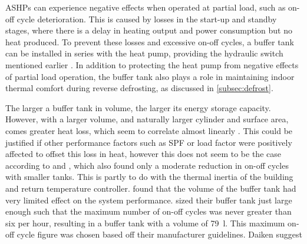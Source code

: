 \acp{ASHP} can experience negative effects when operated at partial load, such as on-off cycle deterioration. This is caused by losses in the start-up and standby stages, where there is a delay in heating output and power consumption but no heat produced. To prevent these losses and excessive on-off cycles, a buffer tank can be installed in series with the heat pump, providing the hydraulic switch mentioned earlier \cite{bagarella_cycling_2013}. In addition to protecting the heat pump from negative effects of partial load operation, the buffer tank also plays a role in maintaining indoor thermal comfort during reverse defrosting, as discussed in \cref{subsec:defrost}.

The larger a buffer tank in volume, the larger its energy storage capacity. However, with a larger volume, and naturally larger cylinder and surface area, comes greater heat loss, which seem to correlate almost linearly \cite{klein_numerical_2014}. This could be justified if other performance factors such as \ac{SPF} or load factor were positively affected to offset this loss in heat, however this does not seem to be the case according to \cite{roccatello_analysis_2022} and \cite{klein_numerical_2014}, which also found only a moderate reduction in on-off cycles with smaller tanks. This is partly to do with the thermal inertia of the building and return temperature controller. 
\citeauthor{klein_numerical_2014} found that the volume of the buffer tank had very limited effect on the system performance. \citeauthor{dongellini_influence_2021} \cite{dongellini_influence_2021} sized their buffer tank just large enough such that the maximum number of on-off cycles was never greater than six per hour,  resulting in a buffer tank with a volume of \SI{79}{\litre}.  This maximum on-off cycle figure was chosen based off their \HP manufacturer guidelines. Daiken suggest %
\cite{dettorre_economic_2018}

